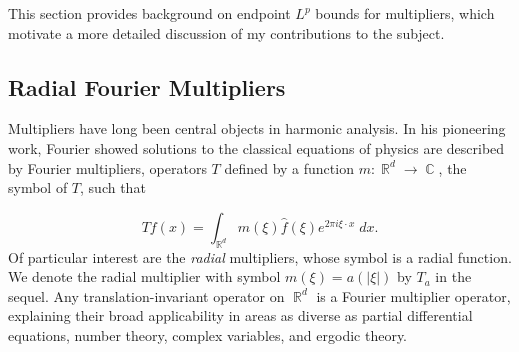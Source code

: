 \documentclass[11pt]{article}
\DeclareMathOperator{\RR}{\mathbb{R}}
\DeclareMathOperator{\CC}{\mathbb{C}}
\begin{document}
This section provides background on endpoint $L^p$ bounds for multipliers, which motivate a more detailed discussion of my contributions to the subject.


\subsection{Radial Fourier Multipliers}

Multipliers have long been central objects in harmonic analysis. %
In his pioneering work, Fourier showed solutions to the classical equations of physics are described by Fourier multipliers, operators $T$ defined by a function $m: \RR^d \to \CC$, the symbol of $T$, such that

%
\[ Tf(x) = \int_{\RR^d} m(\xi) \widehat{f}(\xi) e^{2 \pi i \xi \cdot x}\; dx. \]
%
Of particular interest are the \emph{radial} multipliers, whose symbol is a radial function. We denote the radial multiplier with symbol $m(\xi) = a(|\xi|)$ by $T_a$ in the sequel. Any translation-invariant operator on $\RR^d$ is a Fourier multiplier operator, explaining their broad applicability in areas as diverse as partial differential equations, number theory, complex variables, and ergodic theory.
\end{document}
